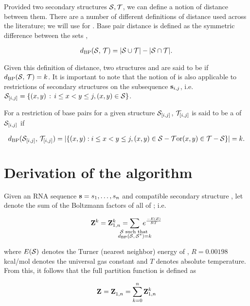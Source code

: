 Provided two secondary structures $\mathcal S,\mathcal T$, we can define a notion of
distance between them. There are a number of different definitions of distance
used across the literature; we will use {\em \bpd} for \fftbor.
Base pair distance is defined as the symmetric difference between the sets
\str,\,\strT

\begin{align}
\label{eq:fftbor:dBP}
\dBP{\str}{\strT} = |\str \cup \strT| - |\str \cap \strT|.
\end{align}

Given this definition of distance, two structures \str and \strT are said to
be \kNbrs if $d_{\text{BP}}(\mathcal S,\,\mathcal T) = k$. It is important to note that
the notion of \bpd is also applicable to restrictions of secondary structures
on the subsequence ${\bf s}_{i,j}$,
i.e. $\mathcal S_{[i,j]} = \{ (x,y) \,:\, i \leq  x < y \leq j,  (x,y) \in \mathcal S \}$.

For a restriction of base pairs for a given structure $\mathcal S_{[i,j]}$,
$\mathcal T_{[i,j]}$ is said to be a \kNbr of $\mathcal S_{[i,j]}$ if

\begin{align}
\label{eq:fftbor:dBPonRestriction}
\dBP{\str_{[i,j]}}{\strT_{[i,j]}} =
|\{ (x,y): i \leq x<y\leq j,
(x,y) \in \str - \strT \text{or} (x,y) \in \strT - \str \}| = k.
\end{align}

\section{Derivation of the \fftbor algorithm}
\label{sec:fftbor:math}

Given an RNA sequence ${\bf s}=s_1,\dots,s_n$ and compatible secondary structure
\strSt, let  denote the sum of the Boltzmann factors
\boltzf{\str} of all \kNbrs \str of \strSt; i.e.

\begin{align}
\bfZ{k}{} = \bfZ{k}{1,n} =
\sum_{\mathclap{\substack{\str \text{ such that } \\ \dBP{\str}{\strSt}=k}}}\;
\boltzF{\str}
\end{align}

where $E(\mathcal S)$ denotes the Turner (nearest neighbor)
energy \cite{}
of \str, $R = 0.00198$ kcal/mol denotes the universal
gas constant and $T$ denotes absolute temperature. From this, it follows that
the full partition function is defined as

\begin{align}
\label{eq:fftbor:partFunc}
\bfZ{}{} = \bfZ{}{1,n} = \sum_{k=0}^n \bfZ{k}{1,n}
\end{align}

